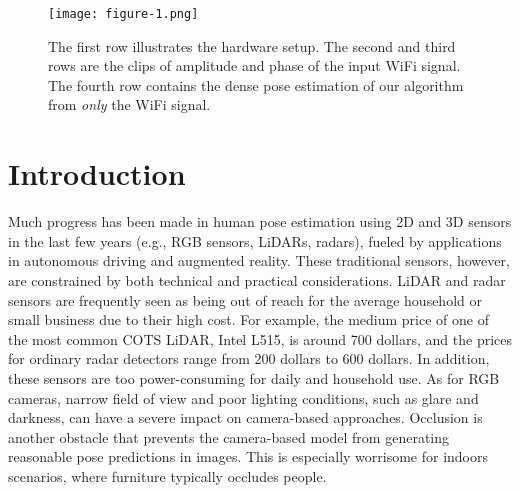\documentclass[sigconf, anonymous=false]{acmart}
\begin{document}



\maketitle
\pagestyle{plain}

\begin{figure*}[htp]
 \centering
 \texttt{[image: figure-1.png]}
 \caption{The first row illustrates the hardware setup. The second and third rows are the clips of amplitude and phase of the input WiFi signal. The fourth row contains the dense pose estimation of our algorithm from {\em only} the WiFi signal.}
 \label{Fig_intro}
\end{figure*}

\section{Introduction}

Much progress has been made in human pose estimation using 2D \cite{DensePose,convolutional-pose,ROMP,vibe,pifu,openpose} and 3D \cite{lidar-3d,voxnet} sensors in the last few years (e.g., RGB sensors, LiDARs, radars), fueled by applications in autonomous driving and augmented reality. These traditional sensors, however, are constrained by both technical and practical considerations. LiDAR and radar sensors are frequently seen as being out of reach for the average household or small business due to their high cost. For example, the medium price of one of the most common COTS LiDAR, Intel L515, is around 700 dollars, and the prices for ordinary radar detectors range from 200 dollars to 600 dollars. In addition, these sensors are too power-consuming for daily and household use. As for RGB cameras, narrow field of view and poor lighting conditions, such as glare and darkness, can have a severe impact on camera-based approaches. Occlusion is another obstacle that prevents the camera-based model from generating reasonable pose predictions in images. This is especially worrisome for indoors scenarios, where furniture typically occludes people. 
\end{document}
